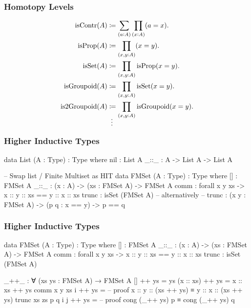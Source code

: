 \documentclass[9pt]{beamer}
\begin{document}
\begin{frame}
\frametitle{Homotopy Levels}

\begin{align*}
  \text{isContr}(A) & \coloneqq \sum_{(a:A)} \prod_{(x:A)} (a = x).
  \\
  \text{isProp}(A) & \coloneqq \prod_{(x,y:A)} (x = y).
  \\
  \text{isSet}(A) & \coloneqq \prod_{(x,y:A)} \text{isProp}(x = y).
  \\
  \text{isGroupoid}(A) & \coloneqq \prod_{(x,y:A)} \text{isSet}(x = y).
  \\
  \text{is2Groupoid}(A) & \coloneqq \prod_{(x,y:A)} \text{isGroupoid}(x = y).
  \\
  \shortvdotswithin{=}
\end{align*}

\end{frame}


\begin{frame}[fragile]
\frametitle{Higher Inductive Types}

\begin{code}
data List (A : Type) : Type where
  nil : List A
  _::_ : A -> List A -> List A

-- Swap list / Finite Multiset as HIT
data FMSet (A : Type) : Type where
  []    : FMSet A
  _::_  : (x : A) -> (xs : FMSet A) -> FMSet A
  comm  : forall x y xs -> x :: y :: xs == y :: x :: xs
  trunc : isSet (FMSet A)
  -- alternatively
  -- trunc : (x y : FMSet A) -> (p q : x == y) -> p == q
\end{code}

\end{frame}

\begin{frame}[fragile]
\frametitle{Higher Inductive Types}

\begin{code}
data FMSet (A : Type) : Type where
  []    : FMSet A
  _::_  : (x : A) -> (xs : FMSet A) -> FMSet A
  comm  : forall x y xs -> x :: y :: xs == y :: x :: xs
  trunc : isSet (FMSet A)

_++_ : ∀ (xs ys : FMSet A) → FMSet A
[] ++ ys = ys
(x :: xs) ++ ys = x :: xs ++ ys
comm x y xs i ++ ys =
  -- proof x :: y :: (xs ++ ys) ≡ y :: x :: (xs ++ ys)
trunc xs zs p q i j ++ ys =
  -- proof cong (_++ ys) p ≡ cong (_++ ys) q
\end{code}

\end{frame}
\end{document}

